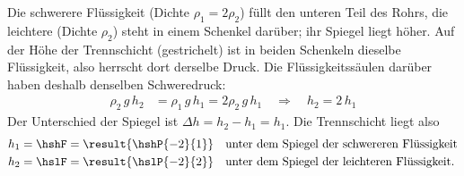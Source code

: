 \begin{center}
\end{center}

Die schwerere Flüssigkeit (Dichte $\rho_1 = 2\rho_2$) füllt den unteren Teil des Rohrs, die leichtere (Dichte $\rho_2$) steht in einem Schenkel darüber; ihr Spiegel liegt höher. Auf der Höhe der Trennschicht (gestrichelt) ist in beiden Schenkeln dieselbe Flüssigkeit, also herrscht dort derselbe Druck. Die Flüssigkeitssäulen darüber haben deshalb denselben Schweredruck:
\begin{align}
 \rho_2\,g\,h_2 &= \rho_1\,g\,h_1 = 2\rho_2\,g\,h_1 \quad\Rightarrow\quad h_2 = 2\,h_1
\end{align}
Der Unterschied der Spiegel ist $\Delta h = h_2 - h_1 = h_1$. Die Trennschicht liegt also
\begin{align}
 h_1 &= \hshF = \result{\hshP{-2}{1}} \quad\text{unter dem Spiegel der schwereren Flüssigkeit}\\
 h_2 &= \hslF = \result{\hslP{-2}{2}} \quad\text{unter dem Spiegel der leichteren Flüssigkeit.}
\end{align}
